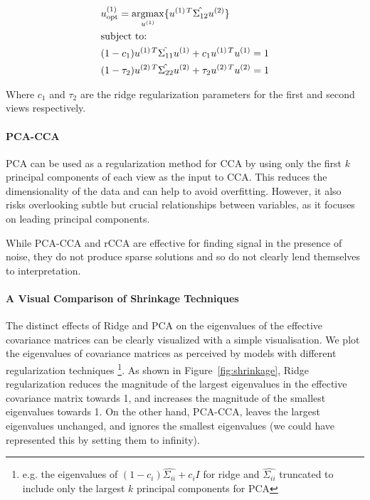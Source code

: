 \begin{align}
     & u^{(1)}_{\text{opt}} = \underset{u^{(1)}}{\mathrm{argmax}} \{ u^{(1)\,T} \hat{\Sigma_{12}} u^{(2)} \} \\
     & \text{subject to:} \notag \\
     & (1 - c_1) u^{(1)\,T} \hat{\Sigma_{11}} u^{(1)} + c_1 u^{(1)\,T} u^{(1)} = 1 \notag \\
     & (1 - \tau_2) u^{(2)\,T} \hat{\Sigma_{22}} u^{(2)} + \tau_2 u^{(2)\,T} u^{(2)} = 1 \notag
\end{align}

Where $c_1$ and $\tau_2$ are the ridge regularization parameters for the first and second views respectively.

\paragraph{PCA-CCA} PCA can be used as a regularization method for CCA by using only the first \( k \) principal components of each view as the input to CCA.
This reduces the dimensionality of the data and can help to avoid overfitting.
However, it also risks overlooking subtle but crucial relationships between variables, as it focuses on leading principal components.

While PCA-CCA and rCCA are effective for finding signal in the presence of noise, they do not produce sparse
solutions and so do not clearly lend themselves to interpretation.

\paragraph{A Visual Comparison of Shrinkage Techniques}

The distinct effects of Ridge and PCA on the eigenvalues of the effective covariance matrices can be clearly visualized with a simple visualisation.
We plot the eigenvalues of covariance matrices as perceived by models with different regularization techniques \footnote{e.g. the eigenvalues of $(1 - c_i) \hat{\Sigma_{ii}} + c_i I$ for ridge and $\hat{\Sigma_{ii}}$ truncated to include only the largest $k$ principal components for PCA}.
As shown in Figure~\ref{fig:shrinkage}, Ridge regularization reduces the magnitude of the largest eigenvalues in the effective covariance matrix towards 1, and increases the magnitude of the smallest eigenvalues towards 1.
On the other hand, PCA-CCA, leaves the largest eigenvalues unchanged, and ignores the smallest eigenvalues (we could have represented this by setting them to infinity).

